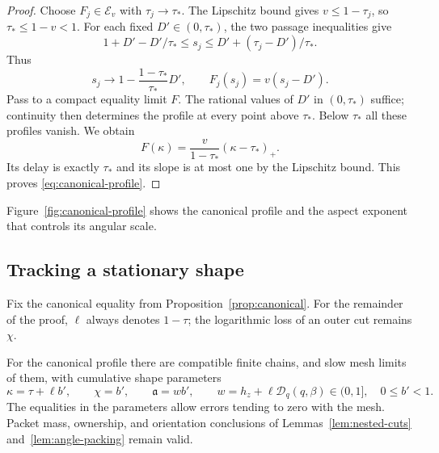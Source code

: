 \begin{proof}
Choose $F_j\in\mathcal E_v$ with $\tau_j\to\tau_*$. The Lipschitz
bound gives $v\le1-\tau_j$, so $\tau_*\le1-v<1$.
For each fixed $D'\in(0,\tau_*)$, the two passage inequalities give
\[
 1+D'-D'/\tau_*\le s_j
 \le D'+(\tau_j-D')/\tau_*.
\]
Thus
\[
 s_j\longrightarrow 1-\frac{1-\tau_*}{\tau_*}D',
 \qquad F_j(s_j)=v(s_j-D').
\]
Pass to a compact equality limit $F$. The rational values of $D'$ in
$(0,\tau_*)$ suffice; continuity then determines the profile at every
point above $\tau_*$. Below $\tau_*$ all these profiles vanish. We obtain
\[
 F(\kappa)=\frac{v}{1-\tau_*}(\kappa-\tau_*)_+.
\]
Its delay is exactly $\tau_*$ and its slope is at most one by the
Lipschitz bound. This proves \eqref{eq:canonical-profile}.
\end{proof}

Figure~\ref{fig:canonical-profile} shows the canonical profile and the
aspect exponent that controls its angular scale.



\subsection{Tracking a stationary shape}

Fix the canonical equality from Proposition~\ref{prop:canonical}. For
the remainder of the proof, $\ell$ always denotes $1-\tau$; the
logarithmic loss of an outer cut remains $\chi$.

\begin{lemma}
\label{lem:stationary-shape}
For the canonical profile there are compatible finite chains, and slow
mesh limits of them, with cumulative shape parameters
\begin{equation}
 \kappa=\tau+\ell b',\qquad
 \chi=b',\qquad \mathfrak a=wb',\qquad
 w=h_z+\ell\mathcal D_q(q,\beta)\in(0,1],
 \quad 0\le b'<1.
 \label{eq:stationary-shape}
\end{equation}
The equalities in the parameters allow errors tending to zero with the
mesh. Packet mass, ownership, and orientation conclusions of
Lemmas~\ref{lem:nested-cuts} and~\ref{lem:angle-packing} remain valid.
\end{lemma}

